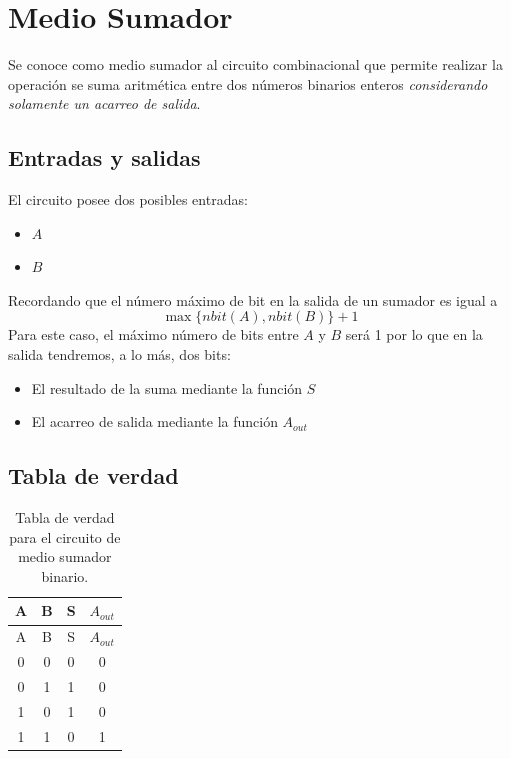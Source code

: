 \documentclass[
]{book}
\providecommand{\tightlist}{%
  \setlength{\itemsep}{0pt}\setlength{\parskip}{0pt}}
\begin{document}
\hypertarget{medio-sumador}{%
\section{Medio Sumador}\label{medio-sumador}}

Se conoce como medio sumador al circuito combinacional que permite realizar la operación se suma aritmética entre dos números binarios enteros \emph{considerando solamente un acarreo de salida}.

\hypertarget{entradas-y-salidas}{%
\subsection{Entradas y salidas}\label{entradas-y-salidas}}

El circuito posee dos posibles entradas:

\begin{itemize}
\tightlist
\item
  \(A\)
\item
  \(B\)
\end{itemize}

Recordando que el número máximo de bit en la salida de un sumador es igual a \[
  \max\{nbit(A), nbit(B)\}+1
\] Para este caso, el máximo número de bits entre \(A\) y \(B\) será 1 por lo que en la salida tendremos, a lo más, dos bits:

\begin{itemize}
\tightlist
\item
  El resultado de la suma mediante la función \(S\)
\item
  El acarreo de salida mediante la función \(A_{out}\)
\end{itemize}

\hypertarget{tabla-de-verdad}{%
\subsection{Tabla de verdad}\label{tabla-de-verdad}}

\begin{longtable}[]{@{}cccc@{}}
\caption{Tabla de verdad para el circuito de medio sumador binario.}\tabularnewline
\toprule
A & B & S & \(A_{out}\)\tabularnewline
\midrule
\endfirsthead
\toprule
A & B & S & \(A_{out}\)\tabularnewline
\midrule
\endhead
0 & 0 & 0 & 0\tabularnewline
0 & 1 & 1 & 0\tabularnewline
1 & 0 & 1 & 0\tabularnewline
1 & 1 & 0 & 1\tabularnewline
\bottomrule
\end{longtable}
\end{document}
